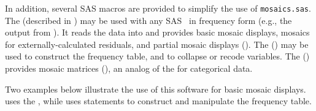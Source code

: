 In addition, several SAS macros
are provided to simplify the use of \texttt{mosaics.sas}. 
The  (described in )
may be used with any SAS \Dset\ in frequency
form (e.g., the output from ).  It reads the data into
\IML{} and provides basic mosaic displays,
mosaics for externally-calculated residuals,
and partial mosaic displays ().
The  () may be used to construct the frequency table, and
to collapse or recode variables.
The  ()
provides mosaic matrices (),
an analog of the \scatmat{} for categorical data.

Two examples below illustrate the use of this software for basic mosaic
displays.
 uses the ,
while 
uses  statements to construct and manipulate the
frequency table.



